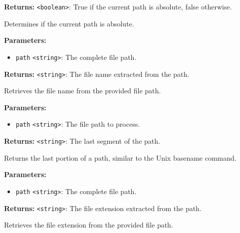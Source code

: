 \documentclass[12pt,a4paper]{article}
\begin{document}
\noindent \textbf{Returns:} \texttt{<boolean>}: True if the current path is absolute, false otherwise.

\noindent Determines if the current path is absolute.

\vspace{5mm}
\noindent {}


\noindent \textbf{Parameters:}
\begin{itemize}
  \item \texttt{path} \texttt{<string>}: The complete file path.
\end{itemize}

\noindent \textbf{Returns:} \texttt{<string>}: The file name extracted from the path.

\noindent Retrieves the file name from the provided file path.

\vspace{5mm}
\noindent {}


\noindent \textbf{Parameters:}
\begin{itemize}
  \item \texttt{path} \texttt{<string>}: The file path to process.
\end{itemize}

\noindent \textbf{Returns:} \texttt{<string>}: The last segment of the path.

\noindent Returns the last portion of a path, similar to the Unix \textasciigrave{}basename\textasciigrave{} command.

\vspace{5mm}
\noindent {}


\noindent \textbf{Parameters:}
\begin{itemize}
  \item \texttt{path} \texttt{<string>}: The complete file path.
\end{itemize}

\noindent \textbf{Returns:} \texttt{<string>}: The file extension extracted from the path.

\noindent Retrieves the file extension from the provided file path.
\end{document}
